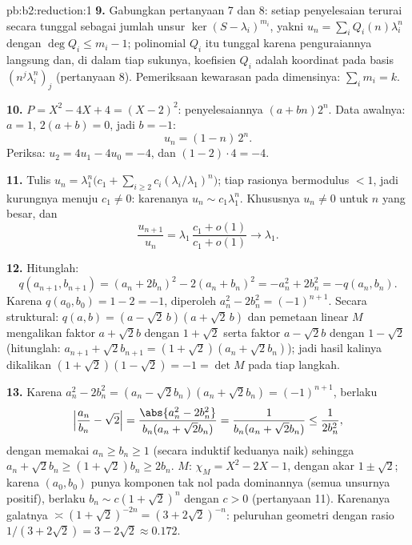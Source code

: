 \begin{solution}{pb:b2:reduction:1}
\textbf{9.} Gabungkan pertanyaan 7 dan 8: setiap penyelesaian terurai
secara tunggal sebagai jumlah unsur $\ker(S -
\lambda_i)^{m_i}$, yakni $u_n = \sum_i Q_i(n)\lambda_i^n$ dengan
$\deg Q_i \leq m_i - 1$; polinomial $Q_i$ itu tunggal karena
penguraiannya langsung dan, di dalam tiap sukunya,
koefisien $Q_i$ adalah koordinat pada basis
$(n^j\lambda_i^n)_j$ (pertanyaan 8). Pemeriksaan kewarasan pada dimensinya:
$\sum_i m_i = k$.

\textbf{10.} $P = X^2 - 4X + 4 = (X - 2)^2$: penyelesaiannya $(a +
bn)2^n$. Data awalnya: $a = 1$, $2(a + b) = 0$, jadi $b = -1$:
\[
u_n = (1 - n)\,2^n .
\]
Periksa: $u_2 = 4u_1 - 4u_0 = -4$, dan $(1 - 2)\cdot4 = -4$.

\textbf{11.} Tulis $u_n = \lambda_1^n\bigl(c_1 + \sum_{i\geq2}
c_i(\lambda_i/\lambda_1)^n\bigr)$; tiap rasionya bermodulus $< 1$,
jadi kurungnya menuju $c_1 \neq 0$: karenanya $u_n \sim c_1\lambda_1^n$.
Khususnya $u_n \neq 0$ untuk $n$ yang besar, dan
\[
\frac{u_{n+1}}{u_n} =
\lambda_1\,\frac{c_1 + o(1)}{c_1 + o(1)} \longrightarrow
\lambda_1 .
\]

\textbf{12.} Hitunglah:
\[
q(a_{n+1}, b_{n+1}) = (a_n + 2b_n)^2 - 2(a_n + b_n)^2
= -a_n^2 + 2b_n^2 = -q(a_n, b_n).
\]
Karena $q(a_0, b_0) = 1 - 2 = -1$, diperoleh $a_n^2 - 2b_n^2 = (-1)^{n+1}$.
Secara struktural: $q(a, b) = (a - \sqrt2\,b)(a + \sqrt2\,b)$ dan
pemetaan linear $M$ mengalikan faktor $a + \sqrt2 b$ dengan $1 +
\sqrt2$ serta faktor $a - \sqrt2 b$ dengan $1 - \sqrt2$ (hitunglah:
$a_{n+1} + \sqrt2 b_{n+1} = (1 + \sqrt2)(a_n + \sqrt2 b_n)$);
jadi hasil kalinya dikalikan $(1 + \sqrt2)(1 - \sqrt2) = -1 =
\det M$ pada tiap langkah.

\textbf{13.} Karena $a_n^2 - 2b_n^2 = (a_n - \sqrt2 b_n)(a_n +
\sqrt2 b_n) = (-1)^{n+1}$, berlaku
\[
\Bigl|\frac{a_n}{b_n} - \sqrt2\Bigr|
= \frac{\abs{a_n^2 - 2b_n^2}}{b_n(a_n + \sqrt2 b_n)}
= \frac{1}{b_n(a_n + \sqrt2 b_n)} \leq \frac1{2b_n^2},
\]
dengan memakai $a_n \geq b_n \geq 1$ (secara induktif keduanya naik)
sehingga $a_n + \sqrt2 b_n \geq (1 + \sqrt2)b_n \geq 2b_n$. 
$M$: $\chi_M = X^2 - 2X - 1$, dengan akar $1 \pm \sqrt2$; karena $(a_0,
b_0)$ punya komponen tak nol pada  dominannya (semua
unsurnya positif), berlaku $b_n \sim c(1 + \sqrt2)^n$ dengan $c > 0$
(pertanyaan 11). Karenanya galatnya $\asymp (1 + \sqrt2)^{-2n} = (3 +
2\sqrt2)^{-n}$: peluruhan geometri dengan rasio $1/(3 + 2\sqrt2) = 3
- 2\sqrt2 \approx 0.172$.


\end{solution}

